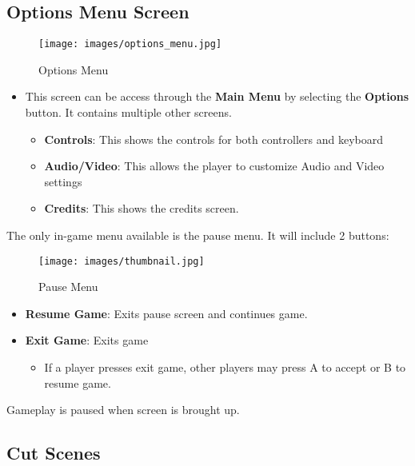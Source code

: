 \documentclass[10pt]{report}
\begin{document}
\subsection{Options Menu Screen}

\begin{figure}[H]
    \centering
    \texttt{[image: images/options\_menu.jpg]}
    \caption{Options Menu}
\end{figure}

\begin{itemize}
    \item This screen can be access through the \textbf{Main Menu} by selecting the \textbf{Options} button. It contains multiple other screens.
    \begin{itemize}
        \item \textbf{Controls}: This shows the controls for both controllers and keyboard
        \item \textbf{Audio/Video}: This allows the player to customize Audio and Video settings
        \item \textbf{Credits}: This shows the credits screen.    
    \end{itemize}
\end{itemize}


The only in-game menu available is the pause menu. It will include 2 buttons:

\begin{figure}[H]
    \centering
    \texttt{[image: images/thumbnail.jpg]}
    \caption{Pause Menu}
\end{figure}

\begin{itemize}
    \item \textbf{Resume Game}: Exits pause screen and continues game.
    \item \textbf{Exit Game}: Exits game
    \begin{itemize}
        \item If a player presses exit game, other players may press A to accept or B to resume game.
    \end{itemize}
\end{itemize}

Gameplay is paused when screen is brought up.

\subsection{Cut Scenes}
\end{document}
